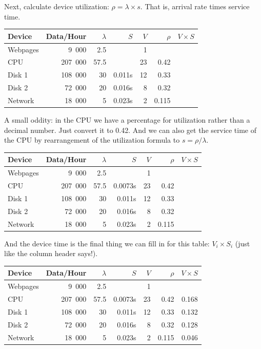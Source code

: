 \documentclass[a4paper]{report}
\begin{document}
Next, calculate device utilization: $\rho = \lambda \times s$. That is, arrival rate times service time.

\begin{center}
\begin{tabular}{l|r|r|r|r|r|r} 
	\textbf{Device} & \textbf{Data/Hour} & \textbf{$\lambda$} & \textbf{$S$} & \textbf{$V$} & \textbf{$\rho$} & \textbf{$V \times S$} \\ \hline
	Webpages & 9~000 & 2.5 & & 1 & & \\ \hline
	CPU & 207~000 & 57.5 &  & 23 & 0.42 & \\ \hline
	Disk 1 & 108~000 & 30 & 0.011s  & 12& 0.33 &\\ \hline
	Disk 2 & 72~000 & 20 & 0.016s & 8 & 0.32 &\\ \hline
	Network & 18~000 & 5 & 0.023s & 2 & 0.115 &
\end{tabular}
\end{center}

A small oddity: in the CPU we have a percentage for utilization rather than a decimal number. Just convert it to 0.42. And we can also get the service time of the CPU by rearrangement of the utilization formula to $s = \rho / \lambda$.

\begin{center}
\begin{tabular}{l|r|r|r|r|r|r} 
	\textbf{Device} & \textbf{Data/Hour} & \textbf{$\lambda$} & \textbf{$S$} & \textbf{$V$} & \textbf{$\rho$} & \textbf{$V \times S$} \\ \hline
	Webpages & 9~000 & 2.5 & & 1 & & \\ \hline
	CPU & 207~000 & 57.5 & 0.0073s & 23 & 0.42 & \\ \hline
	Disk 1 & 108~000 & 30 & 0.011s  & 12& 0.33 &\\ \hline
	Disk 2 & 72~000 & 20 & 0.016s & 8 & 0.32 &\\ \hline
	Network & 18~000 & 5 & 0.023s & 2 & 0.115 &
\end{tabular}
\end{center}

And the device time is the final thing we can fill in for this table: $V_{i} \times S_{i}$ (just like the column header says!).

\begin{center}
\begin{tabular}{l|r|r|r|r|r|r}
	\textbf{Device} & \textbf{Data/Hour} & \textbf{$\lambda$} & \textbf{$S$} & \textbf{$V$} & \textbf{$\rho$} & \textbf{$V \times S$} \\ \hline
	Webpages & 9~000 & 2.5 & & 1 & & \\ \hline
	CPU & 207~000 & 57.5 & 0.0073s & 23 & 0.42 & 0.168\\ \hline
	Disk 1 & 108~000 & 30 & 0.011s  & 12& 0.33 & 0.132\\ \hline
	Disk 2 & 72~000 & 20 & 0.016s & 8 & 0.32 & 0.128\\ \hline
	Network & 18~000 & 5 & 0.023s & 2 & 0.115 & 0.046
\end{tabular}
\end{center}
\end{document}
